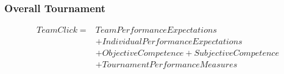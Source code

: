{ \subsubsection{Overall Tournament}

     \begin{align*}
       Team Click =  & Team Performance Expectations  \\
                 &+ Individual Performance Expectations   \\
                 &+ Objective Competence + Subjective Competence \\
                 &+ TournamentPerformanceMeasures  \\
     \end{align*}



   




}
